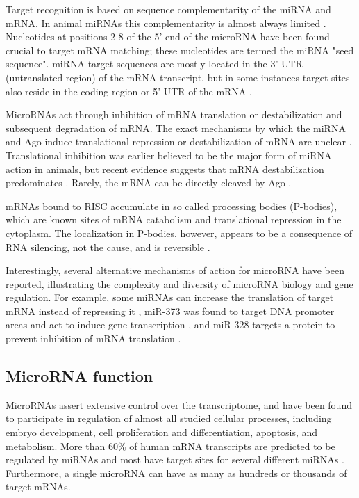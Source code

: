 Target recognition is based on sequence complementarity of the miRNA and mRNA.
In animal miRNAs this complementarity is almost always limited \citep{Ambros2004}.
Nucleotides at positions 2-8 of the 5' end of the microRNA have been found
crucial to target mRNA matching; these nucleotides are termed the miRNA "seed sequence".
miRNA target sequences are mostly located in the 3' UTR (untranslated region)
of the mRNA transcript, but in some instances target sites also reside in the
coding region or 5' UTR of the mRNA \citep{Bartel2009}.

MicroRNAs act through inhibition of mRNA translation or destabilization and
subsequent degradation of mRNA. The exact mechanisms by which the miRNA and
Ago induce translational repression or destabilization of mRNA are unclear
\citep{Filipowicz2008}. Translational inhibition was earlier believed to be
the major form of miRNA action in animals, but recent evidence suggests that
mRNA destabilization predominates \citep{Guo2010}. Rarely, the mRNA can be
directly cleaved by Ago \citep{Du2005}.

mRNAs bound to RISC accumulate in so called processing bodies (P-bodies),
which are known sites of mRNA catabolism and translational repression in the
cytoplasm. The localization in P-bodies, however, appears to be a consequence
of RNA silencing, not the cause, and is reversible \citep{Eulalio2007}.

Interestingly, several alternative mechanisms of action for microRNA have been
reported, illustrating the complexity and diversity of microRNA biology and
gene regulation. For example, some miRNAs can increase the translation of
target mRNA instead of repressing it \citep{Vasudevan2007}, miR-373 was found
to target DNA promoter areas and act to induce gene transcription
\citep{Place2008}, and miR-328 targets a protein to prevent inhibition of mRNA
translation \citep{Eiring2010}.




\subsection{MicroRNA function}\label{microrna-function}

MicroRNAs assert extensive control over the transcriptome, and have been found
to participate in regulation of almost all studied cellular processes,
including embryo development, cell proliferation and differentiation,
apoptosis, and metabolism. More than 60\% of human mRNA transcripts are
predicted to be regulated by miRNAs and most have target sites for several
different miRNAs \citep{Friedman2009}. Furthermore, a single microRNA can have
as many as hundreds or thousands of target mRNAs.

